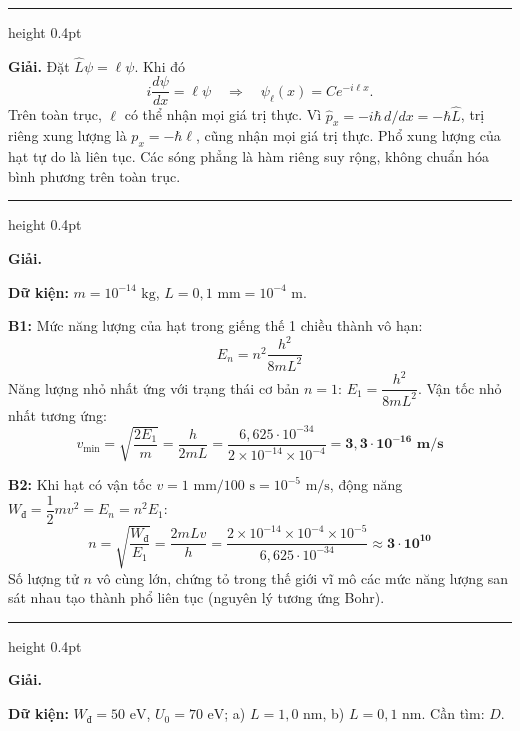 \documentclass[11pt,a4paper]{article}
\renewcommand{\boldsymbol}[1]{\symbf{#1}}
\let\DeBaiOriginal\DeBai
\renewcommand{\DeBai}[1]{\par\Needspace{5\baselineskip}\DeBaiOriginal{#1}}
\newcommand{\PhanCachBai}{%
  \par\Needspace{7\baselineskip}%
  \addvspace{6pt}%
  {\color{black!40}\hrule height 0.4pt}%
  \nobreak\vspace{7pt}\nobreak
}
\begin{document}
\PhanCachBai


\textbf{Giải.}
Đặt $\hat L\psi=\ell\psi$. Khi đó
\[
i\frac{d\psi}{dx}=\ell\psi
\quad\Rightarrow\quad \psi_\ell(x)=C e^{-i\ell x}.
\]
Trên toàn trục, $\ell$ có thể nhận mọi giá trị thực. Vì
$\hat p_x=-i\hbar\,d/dx=-\hbar\hat L$, trị riêng xung lượng là
$p_x=-\hbar\ell$, cũng nhận mọi giá trị thực. Phổ xung lượng của hạt tự do là liên tục.
Các sóng phẳng là hàm riêng suy rộng, không chuẩn hóa bình phương trên toàn trục.

\PhanCachBai


\textbf{Giải.}

\textbf{Dữ kiện:} $m = 10^{-14}\text{ kg}$, $L = 0{,}1\text{ mm} = 10^{-4}\text{ m}$.

\textbf{B1:} Mức năng lượng của hạt trong giếng thế 1 chiều thành vô hạn:
\begin{equation*}
    E_n = n^2 \frac{h^2}{8 m L^2}
\end{equation*}
Năng lượng nhỏ nhất ứng với trạng thái cơ bản $n = 1$: $E_1 = \dfrac{h^2}{8 m L^2}$.
Vận tốc nhỏ nhất tương ứng:
\begin{equation*}
    v_{\min} = \sqrt{\frac{2 E_1}{m}} = \frac{h}{2 m L} = \frac{6{,}625 \cdot 10^{-34}}{2 \times 10^{-14} \times 10^{-4}} = \boldsymbol{3{,}3 \cdot 10^{-16}\text{ m/s}}
\end{equation*}

\textbf{B2:} Khi hạt có vận tốc $v = 1\text{ mm}/100\text{ s} = 10^{-5}\text{ m/s}$, động năng $W_{\text{đ}} = \dfrac{1}{2} m v^2 = E_n = n^2E_1$:
\begin{equation*}
    n = \sqrt{\frac{W_{\text{đ}}}{E_1}} = \frac{2 m L v}{h} = \frac{2 \times 10^{-14} \times 10^{-4} \times 10^{-5}}{6{,}625 \cdot 10^{-34}} \approx \boldsymbol{3 \cdot 10^{10}}
\end{equation*}
Số lượng tử $n$ vô cùng lớn, chứng tỏ trong thế giới vĩ mô các mức năng lượng san sát nhau tạo thành phổ liên tục (nguyên lý tương ứng Bohr).

\PhanCachBai


\textbf{Giải.}

\textbf{Dữ kiện:} $W_{\text{đ}}=50\text{ eV}$, $U_0=70\text{ eV}$; a) $L=1{,}0\text{ nm}$, b) $L=0{,}1\text{ nm}$. Cần tìm: $D$.
\end{document}
